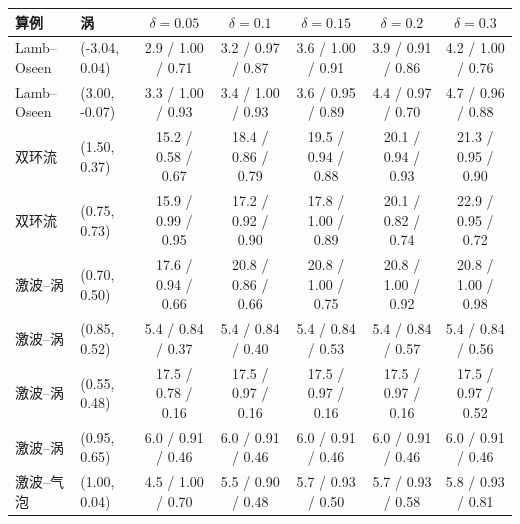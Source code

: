 \begin{tabular}{llccccc}\toprule 算例 & 涡 & $\delta=0.05$ & $\delta=0.1$ & $\delta=0.15$ & $\delta=0.2$ & $\delta=0.3$\\\midrule
Lamb–Oseen & (-3.04, 0.04) & 2.9 / 1.00 / 0.71 & 3.2 / 0.97 / 0.87 & 3.6 / 1.00 / 0.91 & 3.9 / 0.91 / 0.86 & 4.2 / 1.00 / 0.76\\
Lamb–Oseen & (3.00, -0.07) & 3.3 / 1.00 / 0.93 & 3.4 / 1.00 / 0.93 & 3.6 / 0.95 / 0.89 & 4.4 / 0.97 / 0.70 & 4.7 / 0.96 / 0.88\\
双环流 & (1.50, 0.37) & 15.2 / 0.58 / 0.67 & 18.4 / 0.86 / 0.79 & 19.5 / 0.94 / 0.88 & 20.1 / 0.94 / 0.93 & 21.3 / 0.95 / 0.90\\
双环流 & (0.75, 0.73) & 15.9 / 0.99 / 0.95 & 17.2 / 0.92 / 0.90 & 17.8 / 1.00 / 0.89 & 20.1 / 0.82 / 0.74 & 22.9 / 0.95 / 0.72\\
激波–涡 & (0.70, 0.50) & 17.6 / 0.94 / 0.66 & 20.8 / 0.86 / 0.66 & 20.8 / 1.00 / 0.75 & 20.8 / 1.00 / 0.92 & 20.8 / 1.00 / 0.98\\
激波–涡 & (0.85, 0.52) & 5.4 / 0.84 / 0.37 & 5.4 / 0.84 / 0.40 & 5.4 / 0.84 / 0.53 & 5.4 / 0.84 / 0.57 & 5.4 / 0.84 / 0.56\\
激波–涡 & (0.55, 0.48) & 17.5 / 0.78 / 0.16 & 17.5 / 0.97 / 0.16 & 17.5 / 0.97 / 0.16 & 17.5 / 0.97 / 0.16 & 17.5 / 0.97 / 0.52\\
激波–涡 & (0.95, 0.65) & 6.0 / 0.91 / 0.46 & 6.0 / 0.91 / 0.46 & 6.0 / 0.91 / 0.46 & 6.0 / 0.91 / 0.46 & 6.0 / 0.91 / 0.46\\
激波–气泡 & (1.00, 0.04) & 4.5 / 1.00 / 0.70 & 5.5 / 0.90 / 0.48 & 5.7 / 0.93 / 0.50 & 5.7 / 0.93 / 0.58 & 5.8 / 0.93 / 0.81\\
\bottomrule\end{tabular}